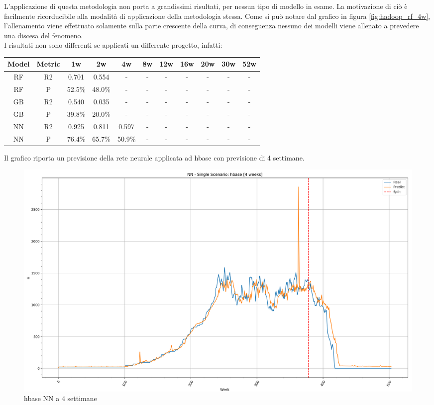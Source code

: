 \documentclass[%
    corpo=12pt,
    twoside,
    oldstyle,
    autoretitolo,
    greek,
    evenboxes,
]{toptesi}
\begin{document}
L'applicazione di questa metodologia non porta a grandissimi risultati, per nessun tipo di modello in esame. La motivazione di ciò è facilmente ricorducibile alla modalità di applicazione della metodologia stessa. Come si può notare dal grafico in figura \ref{fig:hadoop_rf_4w}, l'allenamento viene effettuato solamente sulla parte crescente della curva, di conseguenza nessuno dei modelli viene allenato a prevedere una discesa del fenomeno.\\
I risultati non sono differenti se applicati un differente progetto, infatti:
\begin{center}
   \label{tab:single_scen_hbase}
  \begin{tabular}{ |c|c|c|c|c|c|c|c|c|c|c| }
    \hline
    \textbf{Model} & \textbf{Metric} & \textbf{1w} & \textbf{2w} & \textbf{4w} & \textbf{8w} & \textbf{12w} & \textbf{16w} & \textbf{20w} & \textbf{30w}  & \textbf{52w} \\
    \hline
    \hline
    RF & R2 & 0.701 & 0.554 & - & - & - & - & - & - & -\\
    \hline
    RF & P & 52.5\% & 48.0\% & - & - & - & - & - & - & -\\
    \hline
    \hline
    GB & R2 & 0.540 & 0.035 & - & - & - & - & - & - & -\\
    \hline
    GB & P & 39.8\% & 20.0\% & - & - & - & - & - & - & -\\
    \hline
    \hline
    NN & R2 & 0.925 & 0.811 & 0.597 & - & - & - & - & - & -\\
    \hline
    NN & P & 76.4\% & 65.7\% & 50.9\% & - & - & - & - & - & -\\
    \hline
  \end{tabular}
\end{center}
Il grafico riporta un previsione della rete neurale applicata ad hbase con previsione di 4 settimane.
\begin{figure}[!ht]
  \includegraphics[width=\linewidth]{figure/hbase_nn_4w.png}
  \caption{hbase NN a 4 settimane}
  \label{fig:hbase_nn_4w}
\end{figure}
\end{document}
